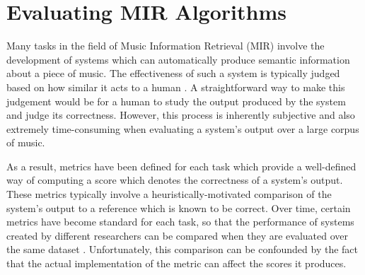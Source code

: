 \documentclass{article}
\title{\mireval{}}
\def\mireval{\texttt{mir\char`_eval}}
\begin{document}
%
\maketitle
%
\begin{abstract}
Central to the field of MIR research is the evaluation of algorithms used to extract information from music data.
We present \mireval{}, an open source software library which provides a transparent and easy-to-use implementation of the most common metrics used to measure the performance of MIR algorithms.
In the present work, we enumerate the metrics implemented by \mireval{} and quantitatively compare each to an existing implementation.
When the score reported by \mireval{} differs substantially from the reference, we detail the differences in implementation.
We also provide a brief overview of \mireval{}'s architecture, design, and intended use.
\end{abstract}
%
\section{Evaluating MIR Algorithms}

Many tasks in the field of Music Information Retrieval (MIR) involve the development of systems which can automatically produce semantic information about a piece of music.
The effectiveness of such a system is typically judged based on how similar it acts to a human \cite{downie2003toward}.
A straightforward way to make this judgement would be for a human to study the output produced by the system and judge its correctness.
However, this process is inherently subjective and also extremely time-consuming when evaluating a system's output over a large corpus of music.

As a result, metrics have been defined for each task which provide a well-defined way of computing a score which denotes the correctness of a system's output.
These metrics typically involve a heuristically-motivated comparison of the system's output to a reference which is known to be correct.
Over time, certain metrics have become standard for each task, so that the performance of systems created by different researchers can be compared when they are evaluated over the same dataset \cite{downie2003toward}.
Unfortunately, this comparison can be confounded by the fact that the actual implementation of the metric can affect the scores it produces.
\end{document}
